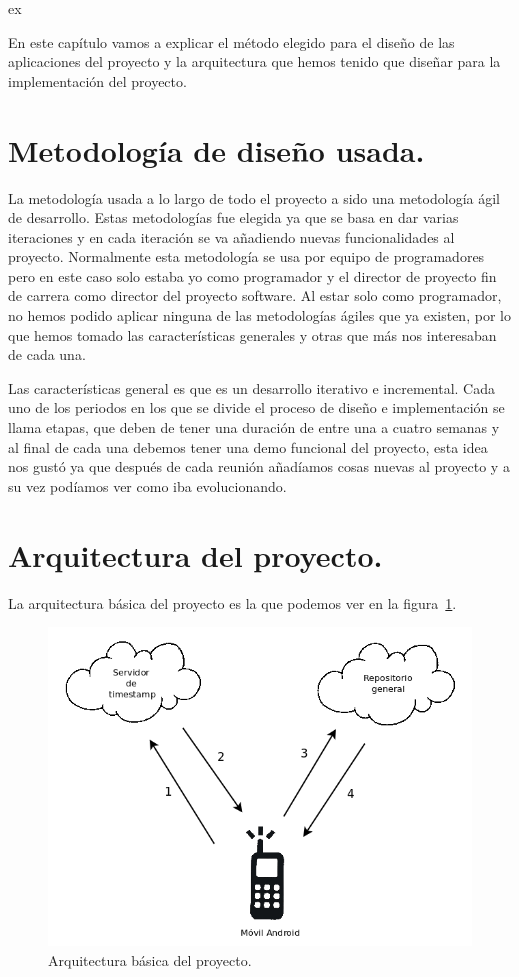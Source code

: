 ex

En este capítulo vamos a explicar el método elegido para el diseño de las aplicaciones del proyecto y la arquitectura que hemos tenido que diseñar para la implementación del proyecto.

\section{Metodología de diseño usada.}

La metodología usada a lo largo de todo el proyecto a sido una metodología ágil de desarrollo. Estas metodologías fue elegida ya que se basa en dar varias iteraciones y en cada iteración se va añadiendo nuevas funcionalidades al proyecto. Normalmente esta metodología se usa por equipo de programadores pero en este caso solo estaba yo como programador y el director de proyecto fin de carrera como director del proyecto software. Al estar solo como programador, no hemos podido aplicar ninguna de las metodologías ágiles que ya existen, por lo que hemos tomado las características generales y otras que más nos interesaban de cada una.

Las características general es que es un desarrollo iterativo e incremental. Cada uno de los periodos en los que se divide el proceso de diseño e implementación se llama etapas, que deben de tener una duración de entre una a cuatro semanas y al final de cada una debemos tener una demo funcional del proyecto, esta idea nos gustó ya que después de cada reunión añadíamos cosas nuevas al proyecto y a su vez podíamos ver como iba evolucionando.  

\section{Arquitectura del proyecto.}

La arquitectura básica del proyecto es la que podemos ver en la figura~\ref{fig:arquitecturaBasica}.

\begin{figure}
  \centering
    \includegraphics[scale=0.3]{./DisenhoYArquitectura/imagenes/arquitecturaBasica.png}
  \caption{Arquitectura básica del proyecto.}
  \label{fig:arquitecturaBasica}
\end{figure}

